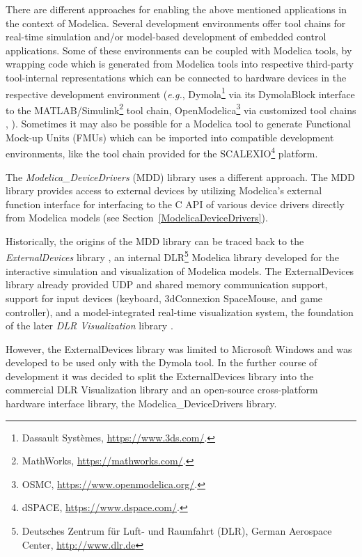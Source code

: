 \documentclass{resources/modelica}
\newcommand{\BTHI}[1]{{\color{blue}{$\parallel_\textrm{BTHI}$#1$\parallel$}}}
\begin{document}
There are different approaches for enabling the above mentioned applications in
the context of Modelica. Several development environments offer tool chains for
real-time simulation and/or model-based development of embedded control
applications.
Some of these environments can be coupled with Modelica tools, by wrapping code
which is generated from Modelica tools into respective third-party tool-internal
representations which can be connected to hardware devices in the respective
development environment (\textit{e.g.},
Dymola\footnote{Dassault Systèmes,
\url{https://www.3ds.com/}.} via its DymolaBlock interface to the
MATLAB/Simulink\footnote{MathWorks,
\url{https://mathworks.com/}.} tool chain, OpenModelica\footnote{OSMC,
\url{https://www.openmodelica.org/}.} via customized tool chains
\citep{Worschech2012}, \BTHI{TODO Thomas: example for SimulationX}).
Sometimes it may also be possible for a Modelica tool to generate Functional
Mock-up Units (FMUs) which can be imported into compatible development
environments, like the tool chain provided for the
SCALEXIO\footnote{dSPACE, \url{https://www.dspace.com/}.}
platform.

The \emph{Modelica\_DeviceDrivers} (MDD) library uses a different approach.
The MDD library provides access to external devices by utilizing Modelica's external
function interface for interfacing to the C API of various device drivers directly from Modelica
models (see Section~\ref{ModelicaDeviceDrivers}).

Historically, the origins of the MDD library can be traced back to the
\emph{ExternalDevices} library \citep{Bellmann2009}, an internal
DLR\footnote{Deutsches Zentrum für Luft- und Raumfahrt (DLR), German Aerospace
Center, \url{http://www.dlr.de}} Modelica library developed for the interactive
simulation and visualization of Modelica models. The ExternalDevices library already provided UDP and shared memory communication support, support for input devices (keyboard, 3dConnexion
SpaceMouse, and game controller), and a model-integrated real-time visualization
system, the foundation of the later \emph{DLR Visualization} library
\citep{Hellerer2014}.

However, the ExternalDevices library was limited to
Microsoft Windows and was developed to be used only with
the Dymola tool. In the further course of development it was decided to
split the ExternalDevices library into the commercial DLR
Visualization library and an open-source cross-platform hardware interface
library, the Modelica\_DeviceDrivers library.
\end{document}
